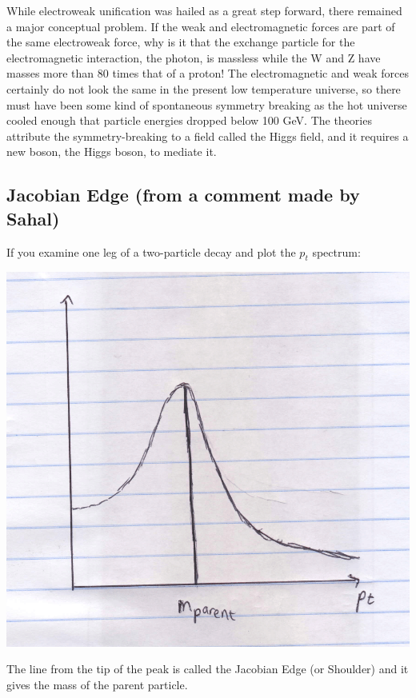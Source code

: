 \documentclass{article}
\begin{document}
While electroweak unification was hailed as a great step forward, there remained a major conceptual problem. If the weak and electromagnetic forces are part of the same electroweak force, why is it that the exchange particle for the electromagnetic interaction, the photon, is massless while the W and Z have masses more than 80 times that of a proton! The electromagnetic and weak forces certainly do not look the same in the present low temperature universe, so there must have been some kind of spontaneous symmetry breaking as the hot universe cooled enough that particle energies dropped below 100 GeV. The theories attribute the symmetry-breaking to a field called the Higgs field, and it requires a new boson, the Higgs boson, to mediate it.

\subsection{Jacobian Edge (from a comment made by Sahal)}
If you examine one leg of a two-particle decay and plot the $p_{t}$ spectrum:\\
\centerline{\includegraphics[scale=0.25]{jac_edge.png}}

The line from the tip of the peak is called the Jacobian Edge (or Shoulder) and it gives the mass of the parent particle.
\end{document}
